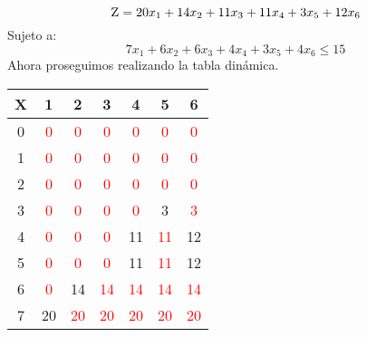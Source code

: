 \documentclass[10pt,letterpaper]{article}
\begin{document}
\[ \textsc{\normalsize Z}\\[0.5cm] = 20x_{1}+14x_{2}+11x_{3}+11x_{4}+3x_{5}+12x_{6} \]
Sujeto a: 
\[ 7x_{1}+6x_{2}+6x_{3}+4x_{4}+3x_{5}+4x_{6} \leq 15 \]
\newline Ahora proseguimos realizando la tabla dinámica.
\begin{center}
\begin{tabu} to 1.0\textwidth { | c | c | c | c | c | c | c | }
\hline
{}\color{black}\textbf{X} & \color{black}\textbf{1} & \color{black}\textbf{2} & \color{black}\textbf{3} & \color{black}\textbf{4} & \color{black}\textbf{5} & \color{black}\textbf{6} \\ 
\hline
{}\color{black}0 & \textcolor{red}{ 0} & \textcolor{red}{ 0} & \textcolor{red}{ 0} & \textcolor{red}{ 0} & \textcolor{red}{ 0} & \textcolor{red}{ 0} \\ 
\hline
{}\color{black}1 & \textcolor{red}{ 0} & \textcolor{red}{ 0} & \textcolor{red}{ 0} & \textcolor{red}{ 0} & \textcolor{red}{ 0} & \textcolor{red}{ 0} \\ 
\hline
{}\color{black}2 & \textcolor{red}{ 0} & \textcolor{red}{ 0} & \textcolor{red}{ 0} & \textcolor{red}{ 0} & \textcolor{red}{ 0} & \textcolor{red}{ 0} \\ 
\hline
{}\color{black}3 & \textcolor{red}{ 0} & \textcolor{red}{ 0} & \textcolor{red}{ 0} & \textcolor{red}{ 0} & \textcolor{GreenBlack}{ 3} & \textcolor{red}{ 3} \\ 
\hline
{}\color{black}4 & \textcolor{red}{ 0} & \textcolor{red}{ 0} & \textcolor{red}{ 0} & \textcolor{GreenBlack}{ 11} & \textcolor{red}{ 11} & \textcolor{GreenBlack}{ 12} \\ 
\hline
{}\color{black}5 & \textcolor{red}{ 0} & \textcolor{red}{ 0} & \textcolor{red}{ 0} & \textcolor{GreenBlack}{ 11} & \textcolor{red}{ 11} & \textcolor{GreenBlack}{ 12} \\ 
\hline
{}\color{black}6 & \textcolor{red}{ 0} & \textcolor{GreenBlack}{ 14} & \textcolor{red}{ 14} & \textcolor{red}{ 14} & \textcolor{red}{ 14} & \textcolor{red}{ 14} \\ 
\hline
{}\color{black}7 & \textcolor{GreenBlack}{ 20} & \textcolor{red}{ 20} & \textcolor{red}{ 20} & \textcolor{red}{ 20} & \textcolor{red}{ 20} & \textcolor{red}{ 20} \\ 

\end{tabu}
\end{center}
\end{document}
